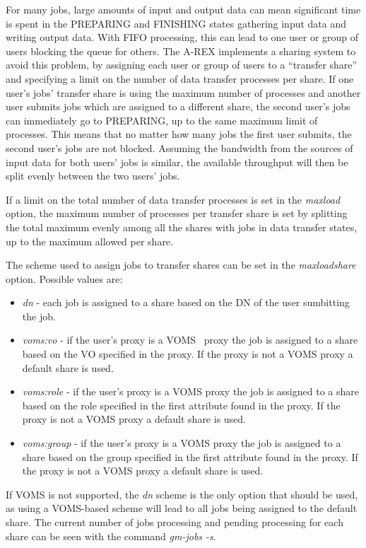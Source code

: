 \documentclass{article}                            %
\begin{document}
For many jobs, large amounts of input and output data can mean
significant time is spent in the PREPARING and FINISHING states
gathering input data and writing output data. With FIFO processing,
this can lead to one user or group of users blocking the queue for
others. The A-REX implements a sharing system to avoid this problem, by
assigning each user or group of users to a ``transfer share'' and
specifying a limit on the number of data transfer processes per
share. If one user's jobs' transfer share is using the maximum number
of processes and another user submits jobs which are assigned to a
different share, the second user's jobs can immediately go to
PREPARING, up to the same maximum limit of processes. This means that
no matter how many jobs the first user submits, the second user's jobs
are not blocked. Assuming the bandwidth from the sources of input data
for both users' jobs is similar, the available throughput will then be
split evenly between the two users' jobs.

If a limit on the total number of data transfer processes is set in
the \emph{maxload} option, the maximum number of processes per
transfer share is set by splitting the total maximum evenly among all
the shares with jobs in data transfer states, up to the maximum
allowed per share.

The scheme used to assign jobs to transfer shares can be set in the
\emph{maxloadshare} option. Possible values are:

\begin{itemize}
\item \emph{dn} - each job is assigned to a share based on the DN of
  the user sumbitting the job.
\item \emph{voms:vo} - if the user's proxy is a VOMS~\cite{voms} proxy
  the job is assigned to a share based on the VO specified in the
  proxy. If the proxy is not a VOMS proxy a default share is used.
\item \emph{voms:role} - if the user's proxy is a VOMS proxy the job
  is assigned to a share based on the role specified in the first
  attribute found in the proxy. If the proxy is not a VOMS proxy a
  default share is used.
\item \emph{voms:group} - if the user's proxy is a VOMS proxy the job is
  assigned to a share based on the group specified in the first
  attribute found in the proxy. If the proxy is not a VOMS proxy a
  default share is used.
\end{itemize}

If VOMS is not supported, the \emph{dn} scheme is the only option that
should be used, as using a VOMS-based scheme will lead to all jobs
being assigned to the default share. The current number of jobs
processing and pending processing for each share can be seen with the
command \emph{gm-jobs -s}.
\end{document}
